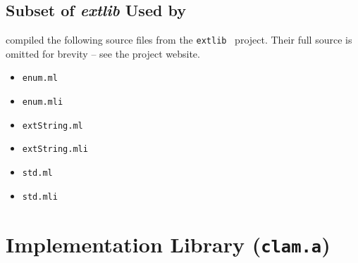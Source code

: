 \subsection{Subset of \emph{extlib} Used by \sys{}}
\sys{} compiled the following source files from the \texttt{extlib}~\cite{extlib:googlecode}
project. Their full source is omitted for brevity -- see the project website.
\begin{itemize}
  \item{\texttt{enum.ml}}
  \item{\texttt{enum.mli}}
  \item{\texttt{extString.ml}}
  \item{\texttt{extString.mli}}
  \item{\texttt{std.ml}}
  \item{\texttt{std.mli}}
\end{itemize}
\comment{
   \clearpage
   \clearpage
   \clearpage
   \clearpage
   \clearpage
   \clearpage
} %

\section{\sys{} Implementation Library (\texttt{clam.a})}
 \clearpage
 \clearpage

